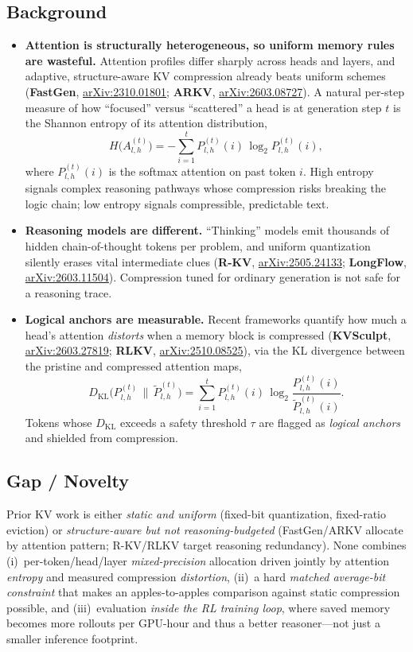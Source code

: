 \documentclass[11pt]{article}
\newcommand{\arxiv}[1]{\href{https://arxiv.org/abs/#1}{arXiv:#1}}
\begin{document}
\subsection{Background}
\begin{itemize}[leftmargin=1.2em,itemsep=3pt]
  \item \textbf{Attention is structurally heterogeneous, so uniform memory rules are
    wasteful.} Attention profiles differ sharply across heads and layers, and adaptive,
    structure-aware KV compression already beats uniform schemes (\textbf{FastGen},
    \arxiv{2310.01801}; \textbf{ARKV}, \arxiv{2603.08727}). A natural per-step measure of how ``focused''
    versus ``scattered'' a head is at generation step $t$ is the Shannon entropy of its
    attention distribution,
    \[ H\!\big(A^{(t)}_{l,h}\big) = -\sum_{i=1}^{t} P^{(t)}_{l,h}(i)\,\log_2 P^{(t)}_{l,h}(i), \tag{1}\]
    where $P^{(t)}_{l,h}(i)$ is the softmax attention on past token $i$. High entropy
    signals complex reasoning pathways whose compression risks breaking the logic chain;
    low entropy signals compressible, predictable text.
  \item \textbf{Reasoning models are different.} ``Thinking'' models emit thousands of
    hidden chain-of-thought tokens per problem, and uniform quantization silently erases
    vital intermediate clues (\textbf{R-KV}, \arxiv{2505.24133}; \textbf{LongFlow}, \arxiv{2603.11504}). Compression tuned for
    ordinary generation is not safe for a reasoning trace.
  \item \textbf{Logical anchors are measurable.} Recent frameworks quantify how much a
    head's attention \emph{distorts} when a memory block is compressed
    (\textbf{KVSculpt}, \arxiv{2603.27819}; \textbf{RLKV}, \arxiv{2510.08525}), via the KL divergence between the pristine
    and compressed attention maps,
    \[ D_{\mathrm{KL}}\!\big(P^{(t)}_{l,h}\,\|\,\tilde P^{(t)}_{l,h}\big)
       = \sum_{i=1}^{t} P^{(t)}_{l,h}(i)\,\log_2\!\frac{P^{(t)}_{l,h}(i)}{\tilde P^{(t)}_{l,h}(i)}. \tag{2}\]
    Tokens whose $D_{\mathrm{KL}}$ exceeds a safety threshold $\tau$ are flagged as
    \emph{logical anchors} and shielded from compression.
\end{itemize}

\subsection{Gap / Novelty}
Prior KV work is either \emph{static and uniform} (fixed-bit quantization, fixed-ratio
eviction) or \emph{structure-aware but not reasoning-budgeted} (FastGen/ARKV allocate by
attention pattern; R-KV/RLKV target reasoning redundancy). None combines
(i)~per-token/head/layer \emph{mixed-precision} allocation driven jointly by attention
\emph{entropy} and measured compression \emph{distortion}, (ii)~a hard \emph{matched
average-bit constraint} that makes an apples-to-apples comparison against static
compression possible, and (iii)~evaluation \emph{inside the RL training loop}, where
saved memory becomes more rollouts per GPU-hour and thus a better reasoner---not just a
smaller inference footprint.
\end{document}
